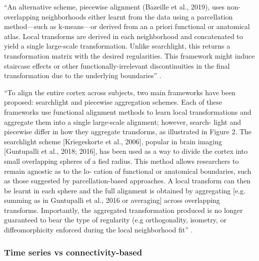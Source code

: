 ``An alternative scheme, piecewise alignment (Bazeille et al., 2019), uses
non-overlapping neighborhoods either learnt from the data using a parcellation
method—such as k-means—or derived from an a priori functional or anatomical
atlas. Local transforms are derived in each neighborhood and concatenated to
yield a single large-scale transformation. Unlike searchlight, this returns a
transformation matrix with the desired regularities. This framework might induce
staircase effects or other functionally-irrelevant discontinuities in the final
transformation due to the underlying boundaries'' \citep{bazeille2021empirical}.

``To align the entire cortex across subjects, two main frameworks have been
proposed: searchlight and piecewise aggregation schemes. Each of these
frameworks use functional alignment methods to learn local transformations and
aggregate them into a single large-scale alignment; however, search- light and
piecewise differ in how they aggregate transforms, as illustrated in Figure 2.
The searchlight scheme [Kriegeskorte et al., 2006], popular in brain imaging
[Guntupalli et al., 2018; 2016], has been used as a way to divide the cortex
into small overlapping spheres of a fied radius. This method allows researchers
to remain agnostic as to the lo- cation of functional or anatomical boundaries,
such as those suggested by parcellation-based approaches. A local transform can
then be learnt in each sphere and the full alignment is obtained by aggregating
[e.g. summing as in Guntupalli et al., 2016 or averaging] across overlapping
transforms. Importantly, the aggregated transformation produced is no longer
guaranteed to bear the type of regularity (e.g orthogonality, isometry, or
diffeomorphicity enforced during the local neighborhood fit''
\citep{bazeille2021empirical}.


\subsubsection{Time series vs connectivity-based}


